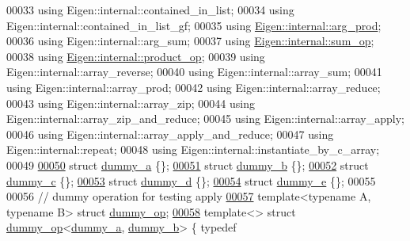 \begin{DoxyCode}
00033 \textcolor{keyword}{using} Eigen::internal::contained\_in\_list;
00034 \textcolor{keyword}{using} Eigen::internal::contained\_in\_list\_gf;
00035 \textcolor{keyword}{using} \hyperlink{struct_eigen_1_1internal_1_1arg__prod}{Eigen::internal::arg\_prod};
00036 \textcolor{keyword}{using} Eigen::internal::arg\_sum;
00037 \textcolor{keyword}{using} \hyperlink{struct_eigen_1_1internal_1_1sum__op}{Eigen::internal::sum\_op};
00038 \textcolor{keyword}{using} \hyperlink{struct_eigen_1_1internal_1_1product__op}{Eigen::internal::product\_op};
00039 \textcolor{keyword}{using} Eigen::internal::array\_reverse;
00040 \textcolor{keyword}{using} Eigen::internal::array\_sum;
00041 \textcolor{keyword}{using} Eigen::internal::array\_prod;
00042 \textcolor{keyword}{using} Eigen::internal::array\_reduce;
00043 \textcolor{keyword}{using} Eigen::internal::array\_zip;
00044 \textcolor{keyword}{using} Eigen::internal::array\_zip\_and\_reduce;
00045 \textcolor{keyword}{using} Eigen::internal::array\_apply;
00046 \textcolor{keyword}{using} Eigen::internal::array\_apply\_and\_reduce;
00047 \textcolor{keyword}{using} Eigen::internal::repeat;
00048 \textcolor{keyword}{using} Eigen::internal::instantiate\_by\_c\_array;
00049 
\hyperlink{structdummy__a}{00050} \textcolor{keyword}{struct }\hyperlink{structdummy__a}{dummy\_a} \{\};
\hyperlink{structdummy__b}{00051} \textcolor{keyword}{struct }\hyperlink{structdummy__b}{dummy\_b} \{\};
\hyperlink{structdummy__c}{00052} \textcolor{keyword}{struct }\hyperlink{structdummy__c}{dummy\_c} \{\};
\hyperlink{structdummy__d}{00053} \textcolor{keyword}{struct }\hyperlink{structdummy__d}{dummy\_d} \{\};
\hyperlink{structdummy__e}{00054} \textcolor{keyword}{struct }\hyperlink{structdummy__e}{dummy\_e} \{\};
00055 
00056 \textcolor{comment}{// dummy operation for testing apply}
\hyperlink{structdummy__op}{00057} \textcolor{keyword}{template}<\textcolor{keyword}{typename} A, \textcolor{keyword}{typename} B> \textcolor{keyword}{struct }\hyperlink{structdummy__op}{dummy\_op};
\hyperlink{structdummy__op_3_01dummy__a_00_01dummy__b_01_4}{00058} \textcolor{keyword}{template}<> \textcolor{keyword}{struct }\hyperlink{structdummy__op}{dummy\_op}<\hyperlink{structdummy__a}{dummy\_a}, \hyperlink{structdummy__b}{dummy\_b}> \{ \textcolor{keyword}{typedef} 

\end{DoxyCode}
